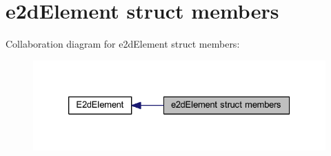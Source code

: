 \hypertarget{group__e2d_element_struct_members}{\section{e2d\-Element struct members}
\label{group__e2d_element_struct_members}
}
Collaboration diagram for e2d\-Element struct members\-:
\nopagebreak
\begin{figure}[H]
\begin{center}
\leavevmode
\includegraphics[width=326pt]{group__e2d_element_struct_members}
\end{center}
\end{figure}
